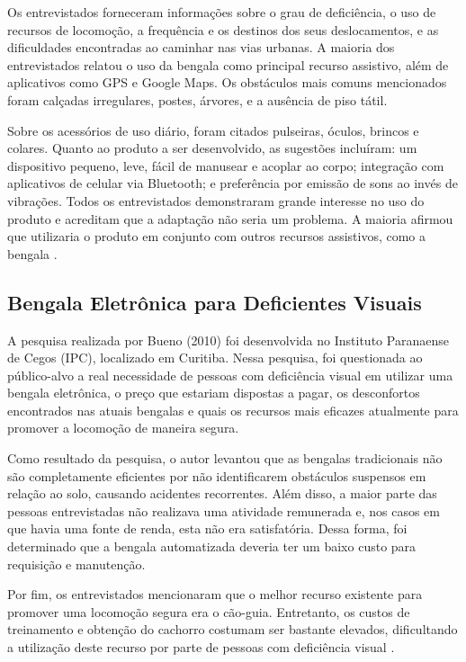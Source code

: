 Os entrevistados forneceram informações sobre o grau de deficiência, o uso de recursos de locomoção, a frequência e os destinos dos seus deslocamentos, e as dificuldades encontradas ao caminhar nas vias urbanas. A maioria dos entrevistados relatou o uso da bengala como principal recurso assistivo, além de aplicativos como GPS e Google Maps. Os obstáculos mais comuns mencionados foram calçadas irregulares, postes, árvores, e a ausência de piso tátil.

Sobre os acessórios de uso diário, foram citados pulseiras, óculos, brincos e colares. Quanto ao produto a ser desenvolvido, as sugestões incluíram: um dispositivo pequeno, leve, fácil de manusear e acoplar ao corpo; integração com aplicativos de celular via Bluetooth; e preferência por emissão de sons ao invés de vibrações. Todos os entrevistados demonstraram grande interesse no uso do produto e acreditam que a adaptação não seria um problema. A maioria afirmou que utilizaria o produto em conjunto com outros recursos assistivos, como a bengala \cite{claramarinho-2020}.

\subsection{Bengala Eletrônica para Deficientes Visuais}

A pesquisa realizada por Bueno (2010) foi desenvolvida no Instituto Paranaense de Cegos (IPC), localizado em Curitiba. Nessa pesquisa, foi questionada ao público-alvo a real necessidade de pessoas com deficiência visual em utilizar uma bengala eletrônica, o preço que estariam dispostas a pagar, os desconfortos encontrados nas atuais bengalas e quais os recursos mais eficazes atualmente para promover a locomoção de maneira segura.

Como resultado da pesquisa, o autor levantou que as bengalas tradicionais não são completamente eficientes por não identificarem obstáculos suspensos em relação ao solo, causando acidentes recorrentes. Além disso, a maior parte das pessoas entrevistadas não realizava uma atividade remunerada e, nos casos em que havia uma fonte de renda, esta não era satisfatória. Dessa forma, foi determinado que a bengala automatizada deveria ter um baixo custo para requisição e manutenção.

Por fim, os entrevistados mencionaram que o melhor recurso existente para promover uma locomoção segura era o cão-guia. Entretanto, os custos de treinamento e obtenção do cachorro costumam ser bastante elevados, dificultando a utilização deste recurso por parte de pessoas com deficiência visual \cite{bueno-2010}.

